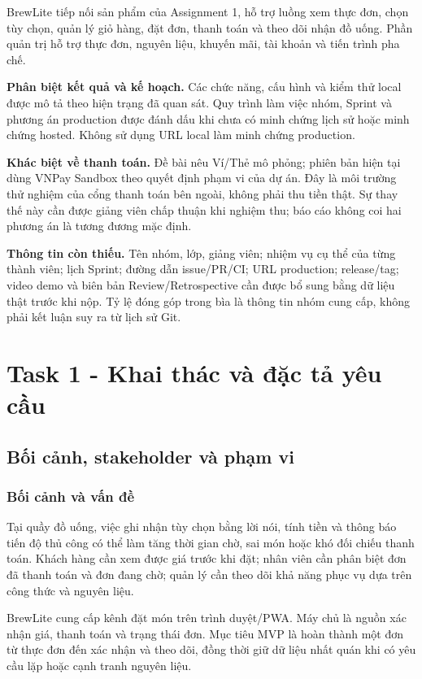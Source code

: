 \documentclass[12pt,a4paper]{article}
\begin{document}
BrewLite tiếp nối sản phẩm của Assignment 1, hỗ trợ luồng xem thực đơn, chọn tùy chọn, quản lý giỏ hàng, đặt đơn, thanh toán và theo dõi nhận đồ uống. Phần quản trị hỗ trợ thực đơn, nguyên liệu, khuyến mãi, tài khoản và tiến trình pha chế.

\textbf{Phân biệt kết quả và kế hoạch.} Các chức năng, cấu hình và kiểm thử local được mô tả theo hiện trạng đã quan sát. Quy trình làm việc nhóm, Sprint và phương án production được đánh dấu khi chưa có minh chứng lịch sử hoặc minh chứng hosted. Không sử dụng URL local làm minh chứng production.

\textbf{Khác biệt về thanh toán.} Đề bài nêu Ví/Thẻ mô phỏng; phiên bản hiện tại dùng VNPay Sandbox theo quyết định phạm vi của dự án. Đây là môi trường thử nghiệm của cổng thanh toán bên ngoài, không phải thu tiền thật. Sự thay thế này cần được giảng viên chấp thuận khi nghiệm thu; báo cáo không coi hai phương án là tương đương mặc định.

\textbf{Thông tin còn thiếu.} Tên nhóm, lớp, giảng viên; nhiệm vụ cụ thể của từng thành viên; lịch Sprint; đường dẫn issue/PR/CI; URL production; release/tag; video demo và biên bản Review/Retrospective cần được bổ sung bằng dữ liệu thật trước khi nộp. Tỷ lệ đóng góp trong bìa là thông tin nhóm cung cấp, không phải kết luận suy ra từ lịch sử Git.

\clearpage
\begingroup
\small{}
\tableofcontents
\endgroup
\clearpage
\listoffigures
\clearpage
{}

\section{Task 1 - Khai thác và đặc tả yêu cầu}
\subsection{Bối cảnh, stakeholder và phạm vi}
\subsubsection{Bối cảnh và vấn đề}
Tại quầy đồ uống, việc ghi nhận tùy chọn bằng lời nói, tính tiền và thông báo tiến độ thủ công có thể làm tăng thời gian chờ, sai món hoặc khó đối chiếu thanh toán. Khách hàng cần xem được giá trước khi đặt; nhân viên cần phân biệt đơn đã thanh toán và đơn đang chờ; quản lý cần theo dõi khả năng phục vụ dựa trên công thức và nguyên liệu.

BrewLite cung cấp kênh đặt món trên trình duyệt/PWA. Máy chủ là nguồn xác nhận giá, thanh toán và trạng thái đơn. Mục tiêu MVP là hoàn thành một đơn từ thực đơn đến xác nhận và theo dõi, đồng thời giữ dữ liệu nhất quán khi có yêu cầu lặp hoặc cạnh tranh nguyên liệu.
\end{document}
